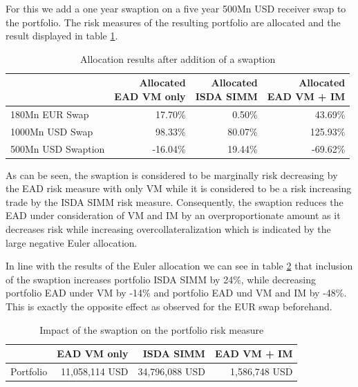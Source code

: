 \documentclass[../Thesis_AHoecherl.tex]{subfiles}
\begin{document}
    For this we add a one year swaption on a five year 500Mn USD receiver swap to the portfolio. The risk measures of the resulting portfolio are allocated and the result displayed in table \ref{tab:3TradeRatesAllocation}. 

    \begin{table}[htbp]
        \centering
        \begin{tabular}{l||r|r|r}
                & \makecell{Allocated \\ \gls{EAD} \gls{VM} only} &\makecell{Allocated \\ \gls{ISDA SIMM}} &\makecell{Allocated \\ \gls{EAD} \gls{VM} + IM} \\
                \toprule
        180Mn EUR Swap & 17.70\% & 0.50\% & 43.69\% \\
        1000Mn USD Swap & 98.33\% & 80.07\% & 125.93\% \\
        500Mn USD Swaption & -16.04\% & 19.44\% & -69.62\% \\
        \end{tabular}%
        \caption{Allocation results after addition of a swaption}
        \label{tab:3TradeRatesAllocation}%
    \end{table}%
    As can be seen, the swaption is considered to be marginally risk decreasing by the \gls{EAD} risk measure with only \gls{VM} while it is considered to be a risk increasing trade by the \gls{ISDA SIMM} risk measure. Consequently, the swaption reduces the \gls{EAD} under consideration of \gls{VM} and \gls{IM} by an overproportionate amount as it decreases risk while increasing overcollateralization which is indicated by the large negative Euler allocation.

    In line with the results of the Euler allocation we can see in table \ref{tab:3TradeRatesResults} that inclusion of the swaption increases portfolio \gls{ISDA SIMM} by 24\%, while decreasing portfolio \gls{EAD} under \gls{VM} by -14\% and portfolio \gls{EAD} und \gls{VM} and \gls{IM} by -48\%. This is exactly the opposite effect as observed for the EUR swap beforehand.

    \begin{table}[htbp]
        \centering
        \begin{tabular}{l||r|r|r}
                & \gls{EAD} \gls{VM} only &\gls{ISDA SIMM} & \gls{EAD} \gls{VM} + \gls{IM} \\
                \toprule
        Portfolio & 11,058,114 USD & 34,796,088 USD & 1,586,748 USD \\
        \end{tabular}%
        \caption{Impact of the swaption on the portfolio risk measure}
        \label{tab:3TradeRatesResults}%
    \end{table}%
\end{document}

